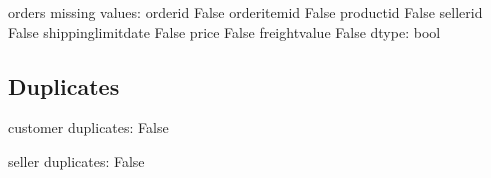 \documentclass[letterpaper,10pt,english]{jupyterBook}
\begin{document}
\begin{sphinxVerbatim}[commandchars=\\\{\}]
orders missing values: 
order\PYGZus{}id               False
order\PYGZus{}item\PYGZus{}id          False
product\PYGZus{}id             False
seller\PYGZus{}id              False
shipping\PYGZus{}limit\PYGZus{}date    False
price                  False
freight\PYGZus{}value          False
dtype: bool
\end{sphinxVerbatim}


\subsection{Duplicates}
\label{\detokenize{c7_case_studies/Olist:duplicates}}
\begin{sphinxVerbatim}[commandchars=\\\{\}]
\end{sphinxVerbatim}

\begin{sphinxVerbatim}[commandchars=\\\{\}]
customer duplicates: 
False
\end{sphinxVerbatim}

\begin{sphinxVerbatim}[commandchars=\\\{\}]
\end{sphinxVerbatim}

\begin{sphinxVerbatim}[commandchars=\\\{\}]
seller duplicates: 
False
\end{sphinxVerbatim}

\begin{sphinxVerbatim}[commandchars=\\\{\}]
\end{sphinxVerbatim}
\end{document}
